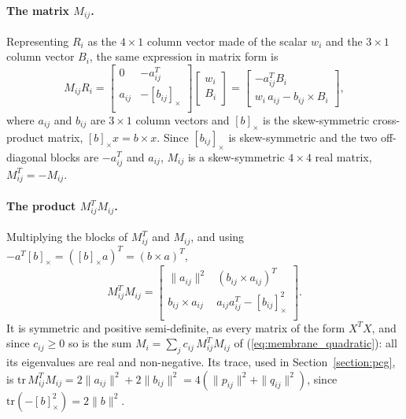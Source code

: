 \documentclass{birkjour}
\theoremstyle{remark}
\numberwithin{equation}{section}
\begin{document}
\paragraph{The matrix $M_{ij}$.} Representing $R_i$ as the $4 \times 1$ column vector made of the scalar $w_i$ and the $3 \times 1$ column vector $B_i$, the same expression in matrix form is
\begin{equation}
	M_{ij} R_i =
	\left[\begin{array}{cc}
		0        &       -a_{ij}^T \\
		a_{ij}  &   -\left[ b_{ij} \right]_\times \\
	\end{array}\right]
	\left[\begin{array}{c}
		w_i \\
		B_i
	\end{array}\right] =
	\left[\begin{array}{c}
		-a_{ij}^T B_i \\
		w_i \, a_{ij} - b_{ij} \times B_i
	\end{array}\right],
\end{equation}
where $a_{ij}$ and $b_{ij}$ are $3 \times 1$ column vectors and $\left[ b \right]_\times$ is the skew-symmetric cross-product matrix, $\left[ b \right]_\times x = b \times x$. Since $\left[ b_{ij} \right]_\times$ is skew-symmetric and the two off-diagonal blocks are $-a_{ij}^T$ and $a_{ij}$, $M_{ij}$ is a skew-symmetric $4 \times 4$ real matrix, $M_{ij}^T = -M_{ij}$.

\paragraph{The product $M_{ij}^T M_{ij}$.} Multiplying the blocks of $M_{ij}^T$ and $M_{ij}$, and using $-a^T [b]_\times = ([b]_\times a)^T = (b \times a)^T$,
\begin{equation}
	M_{ij}^T M_{ij} =
	\left[\begin{array}{cc}
		\| a_{ij} \|^2       &         (b_{ij} \times a_{ij})^T \\
		b_{ij} \times a_{ij}  &    a_{ij} a_{ij}^T - \left[ b_{ij} \right]^2_\times \\
	\end{array}\right].
\end{equation}
It is symmetric and positive semi-definite, as every matrix of the form $X^T X$, and since $c_{ij} \geq 0$ so is the sum $M_i = \sum_{j} c_{ij} \, M_{ij}^T M_{ij}$ of (\ref{eq:membrane_quadratic}): all its eigenvalues are real and non-negative. Its trace, used in Section~\ref{section:pcg}, is $\mathrm{tr} \, M_{ij}^T M_{ij} = 2 \|a_{ij}\|^2 + 2 \|b_{ij}\|^2 = 4 (\|p_{ij}\|^2 + \|q_{ij}\|^2)$, since $\mathrm{tr}(-[b]_\times^2) = 2 \|b\|^2$.
\end{document}
